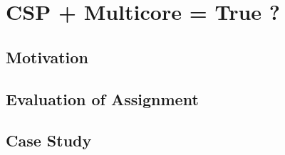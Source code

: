 
\chapter{CSP + Multicore = True ?}
\label{ch:multicore_csp}

\section{Motivation}

\section{Evaluation of Assignment}

\section{Case Study}
